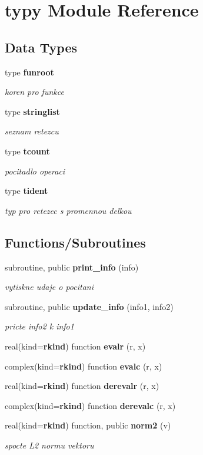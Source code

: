 \section{typy Module Reference}
\label{namespacetypy}
\subsection*{Data Types}
\begin{DoxyCompactItemize}
\item 
type {\bf funroot}
\begin{DoxyCompactList}\small\item\em koren pro funkce \end{DoxyCompactList}\item 
type {\bf stringlist}
\begin{DoxyCompactList}\small\item\em seznam retezcu \end{DoxyCompactList}\item 
type {\bf tcount}
\begin{DoxyCompactList}\small\item\em pocitadlo operaci \end{DoxyCompactList}\item 
type {\bf tident}
\begin{DoxyCompactList}\small\item\em typ pro retezec s promennou delkou \end{DoxyCompactList}\end{DoxyCompactItemize}
\subsection*{Functions/\+Subroutines}
\begin{DoxyCompactItemize}
\item 
subroutine, public {\bf print\+\_\+info} (info)
\begin{DoxyCompactList}\small\item\em vytiskne udaje o pocitani \end{DoxyCompactList}\item 
subroutine, public {\bf update\+\_\+info} (info1, info2)
\begin{DoxyCompactList}\small\item\em pricte info2 k info1 \end{DoxyCompactList}\item 
real(kind={\bf rkind}) function {\bf evalr} (r, x)
\item 
complex(kind={\bf rkind}) function {\bf evalc} (r, x)
\item 
real(kind={\bf rkind}) function {\bf derevalr} (r, x)
\item 
complex(kind={\bf rkind}) function {\bf derevalc} (r, x)
\item 
real(kind={\bf rkind}) function, public {\bf norm2} (v)
\begin{DoxyCompactList}\small\item\em spocte L2 normu vektoru \end{DoxyCompactList}\end{DoxyCompactItemize}
